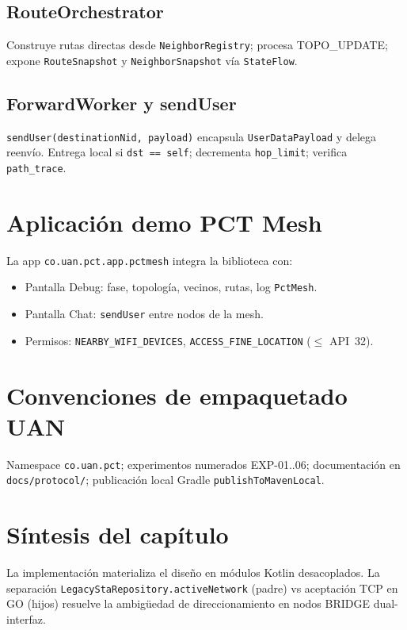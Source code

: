 \subsection{RouteOrchestrator}

Construye rutas directas desde \texttt{NeighborRegistry}; procesa TOPO\_UPDATE; expone \texttt{RouteSnapshot} y \texttt{NeighborSnapshot} vía \texttt{StateFlow}.

\subsection{ForwardWorker y sendUser}

\texttt{sendUser(destinationNid, payload)} encapsula \texttt{UserDataPayload} y delega reenvío. Entrega local si \texttt{dst == self}; decrementa \texttt{hop\_limit}; verifica \texttt{path\_trace}.

\section{Aplicación demo PCT Mesh}
\label{sec:app-demo}

La app \texttt{co.uan.pct.app.pctmesh} integra la biblioteca con:
\begin{itemize}
  \item Pantalla Debug: fase, topología, vecinos, rutas, log \texttt{PctMesh}.
  \item Pantalla Chat: \texttt{sendUser} entre nodos de la mesh.
  \item Permisos: \texttt{NEARBY\_WIFI\_DEVICES}, \texttt{ACCESS\_FINE\_LOCATION} ($\leq$ API~32).
\end{itemize}

\section{Convenciones de empaquetado UAN}
\label{sec:empaquetado}

Namespace \texttt{co.uan.pct}; experimentos numerados EXP-01..06; documentación en \texttt{docs/protocol/}; publicación local Gradle \texttt{publishToMavenLocal}.

\section{Síntesis del capítulo}
\label{sec:sintesis-desarrollo}

La implementación materializa el diseño en módulos Kotlin desacoplados. La separación \texttt{LegacyStaRepository.activeNetwork} (padre) vs aceptación TCP en GO (hijos) resuelve la ambigüedad de direccionamiento en nodos BRIDGE dual-interfaz.
